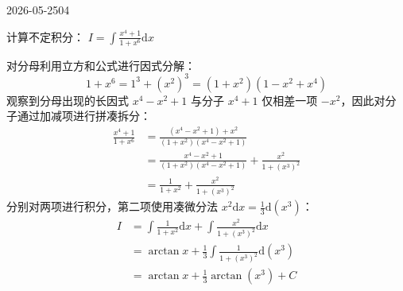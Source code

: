 \begin{mistake}{2026-05-25}{04}

\begin{problemcontent}
计算不定积分：
\( I = \int \frac{x^4 + 1}{1 + x^6} \mathrm{d}x \)
\end{problemcontent}

\begin{solutioncontent}
对分母利用立方和公式进行因式分解：
\[
1 + x^6 = 1^3 + (x^2)^3 = (1 + x^2)(1 - x^2 + x^4)
\]
观察到分母出现的长因式 \(x^4 - x^2 + 1\) 与分子 \(x^4 + 1\) 仅相差一项 \(-x^2\)，因此对分子通过加减项进行拼凑拆分：
\[\begin{aligned}
\frac{x^4 + 1}{1 + x^6} &= \frac{(x^4 - x^2 + 1) + x^2}{(1 + x^2)(x^4 - x^2 + 1)} \\
&= \frac{x^4 - x^2 + 1}{(1 + x^2)(x^4 - x^2 + 1)} + \frac{x^2}{1 + (x^3)^2} \\
&= \frac{1}{1 + x^2} + \frac{x^2}{1 + (x^3)^2}
\end{aligned}\]
分别对两项进行积分，第二项使用凑微分法 \(x^2 \mathrm{d}x = \frac{1}{3}\mathrm{d}(x^3)\)：
\[\begin{aligned}
I &= \int \frac{1}{1 + x^2} \mathrm{d}x + \int \frac{x^2}{1 + (x^3)^2} \mathrm{d}x \\
&= \arctan x + \frac{1}{3} \int \frac{1}{1 + (x^3)^2} \mathrm{d}(x^3) \\
&= \arctan x + \frac{1}{3} \arctan(x^3) + C
\end{aligned}\]
\end{solutioncontent}


\end{mistake}
